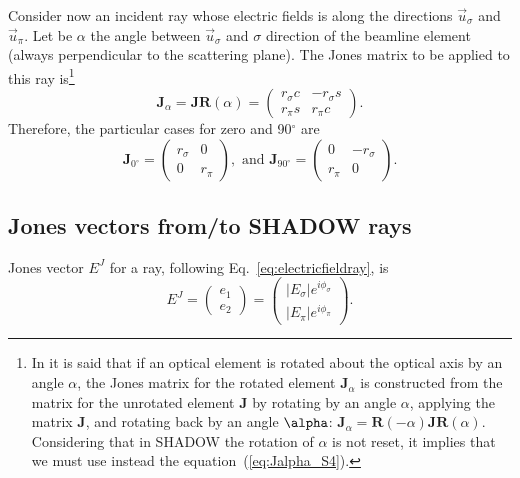 \documentclass{iucr}
\begin{document}
Consider now an incident ray whose electric fields is along the directions $\vec{u}_\sigma$ and $\vec{u}_\pi$. Let be $\alpha$ the angle between $\vec{u}_\sigma$ and $\sigma$ direction of the beamline element  (always perpendicular to the scattering plane). The Jones matrix to be applied to this ray is\footnote{
In \cite{LeClair} it is said that if an optical element is rotated about the optical axis by an angle $\alpha$, the Jones matrix for the
rotated element $\textbf{J}_\alpha$ is constructed from the matrix for the unrotated element $\textbf{J}$ by rotating by an angle $\alpha$, applying the matrix $\textbf{J}$, and rotating back by an angle $\-\alpha$:
$\textbf{J}_\alpha = \textbf{R}(-\alpha) \textbf{J} \textbf{R}(\alpha)$.
Considering that in SHADOW the rotation of $\alpha$ is not reset, it implies that we must use instead the equation~(\ref{eq:Jalpha_S4}).
}
\begin{equation}\label{eq:Jalpha_S4}
    \textbf{J}_\alpha =  \textbf{J} \textbf{R}(\alpha)=
    \begin{pmatrix}
r_\sigma c & -r_\sigma s\\
r_\pi s& 
r_\pi c
\end{pmatrix}.
\end{equation}
Therefore, the particular cases for zero and 90$^\circ$ are
\begin{equation}
\textbf{J}_{0^\circ} = 
\begin{pmatrix}
r_\sigma & 0\\
0 & r_\pi
\end{pmatrix},\text{~and~}
\textbf{J}_{90^\circ} = 
\begin{pmatrix}
0 & -r_\sigma\\
r_\pi & 0
\end{pmatrix}. \nonumber
\end{equation}

\subsection{Jones vectors from/to SHADOW rays}
\label{sec:JonesAndShadow}

Jones vector $E^J$ for a ray, following Eq.~\ref{eq:electricfieldray}, is
\begin{equation}
    E^J = 
        \begin{pmatrix}
        e_1 \\
        e_2
    \end{pmatrix}
    =
    \begin{pmatrix}
        |E_{\sigma}| e^{i \phi_\sigma} \\
        |E_{\pi}| e^{i \phi_\pi}
    \end{pmatrix}.
\end{equation}
\end{document}
